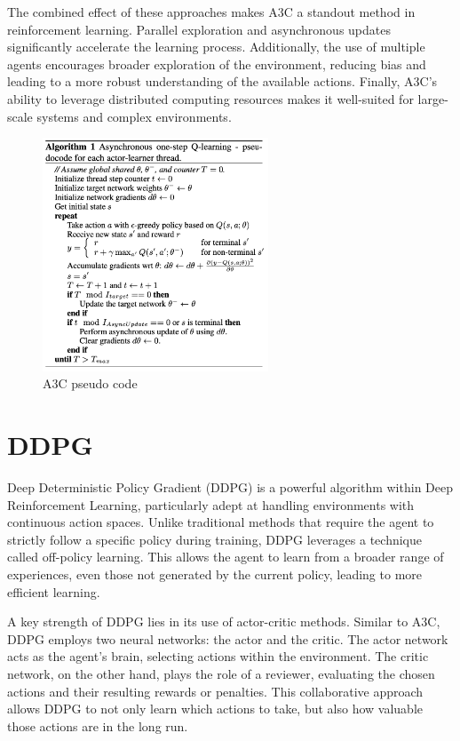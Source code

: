 \documentclass{article}
\begin{document}
The combined effect of these approaches makes A3C a standout method in
reinforcement learning. Parallel exploration and asynchronous updates
significantly accelerate the learning process. Additionally, the use of
multiple agents encourages broader exploration of the environment, reducing
bias and leading to a more robust understanding of the available actions.
Finally, A3C's ability to leverage distributed computing resources makes it
well-suited for large-scale systems and complex environments.

\begin{figure}[h]
    \centering
    \includegraphics[width=0.6\textwidth]{a3c.png}
    \caption{A3C pseudo code}
\end{figure}

\section*{DDPG}

Deep Deterministic Policy Gradient (DDPG) is a powerful algorithm within Deep
Reinforcement Learning, particularly adept at handling environments with
continuous action spaces. Unlike traditional methods that require the agent to
strictly follow a specific policy during training, DDPG leverages a technique
called off-policy learning. This allows the agent to learn from a broader range
of experiences, even those not generated by the current policy, leading to more
efficient learning.

A key strength of DDPG lies in its use of actor-critic methods. Similar to A3C,
DDPG employs two neural networks: the actor and the critic. The actor network
acts as the agent's brain, selecting actions within the environment. The critic
network, on the other hand, plays the role of a reviewer, evaluating the chosen
actions and their resulting rewards or penalties. This collaborative approach
allows DDPG to not only learn which actions to take, but also how valuable
those actions are in the long run.
\end{document}

